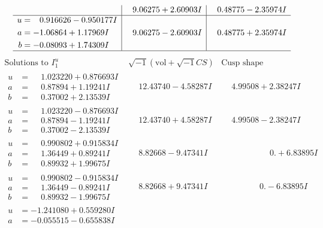 \documentclass[1p]{elsarticle_modified}
\theoremstyle{definition}
\newcommand{\I}{\sqrt{-1}}
\begin{document}
$$\begin{array}{c|c|c}
 & \phantom{-}9.06275 + 2.60903 I & \phantom{-}0.48775 - 2.35974 I \\ \hline\begin{aligned}
u &= \phantom{-}0.916626 - 0.950177 I \\
a &= -1.06864 + 1.17969 I \\
b &= -0.08093 + 1.74309 I\end{aligned}
 & \phantom{-}9.06275 - 2.60903 I & \phantom{-}0.48775 + 2.35974 I\\
 \hline 
 \end{array}$$\newpage$$\begin{array}{c|c|c}  
\text{Solutions to }I^u_{1}& \I (\text{vol} + \sqrt{-1}CS) & \text{Cusp shape}\\
 \hline 
\begin{aligned}
u &= \phantom{-}1.023220 + 0.876693 I \\
a &= \phantom{-}0.87894 + 1.19241 I \\
b &= \phantom{-}0.37002 + 2.13539 I\end{aligned}
 & \phantom{-}12.43740 - 4.58287 I & \phantom{-}4.99508 + 2.38247 I \\ \hline\begin{aligned}
u &= \phantom{-}1.023220 - 0.876693 I \\
a &= \phantom{-}0.87894 - 1.19241 I \\
b &= \phantom{-}0.37002 - 2.13539 I\end{aligned}
 & \phantom{-}12.43740 + 4.58287 I & \phantom{-}4.99508 - 2.38247 I \\ \hline\begin{aligned}
u &= \phantom{-}0.990802 + 0.915834 I \\
a &= \phantom{-}1.36449 + 0.89241 I \\
b &= \phantom{-}0.89932 + 1.99675 I\end{aligned}
 & \phantom{-}8.82668 - 9.47341 I & \phantom{-0.000000 -}0. + 6.83895 I \\ \hline\begin{aligned}
u &= \phantom{-}0.990802 - 0.915834 I \\
a &= \phantom{-}1.36449 - 0.89241 I \\
b &= \phantom{-}0.89932 - 1.99675 I\end{aligned}
 & \phantom{-}8.82668 + 9.47341 I & \phantom{-0.000000 } 0. - 6.83895 I \\ \hline\begin{aligned}
u &= -1.241080 + 0.559280 I \\
a &= -0.055515 - 0.655838 I \\

\end{aligned}
\end{array}$$
\end{document}
